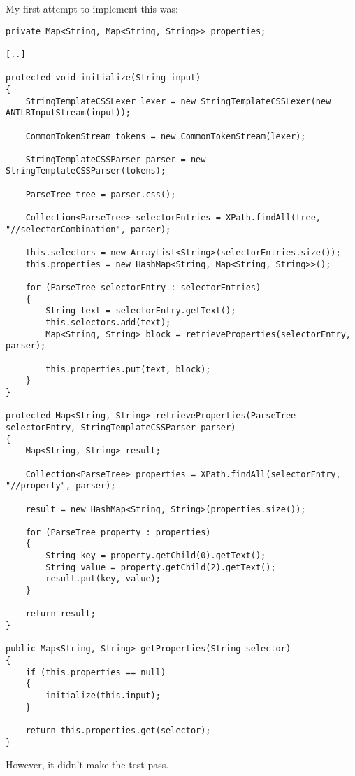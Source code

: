 \documentclass[11pt]{article}
\begin{document}
My first attempt to implement this was:

\begin{verbatim}
private Map<String, Map<String, String>> properties;

[..]

protected void initialize(String input)
{
    StringTemplateCSSLexer lexer = new StringTemplateCSSLexer(new ANTLRInputStream(input));

    CommonTokenStream tokens = new CommonTokenStream(lexer);

    StringTemplateCSSParser parser = new StringTemplateCSSParser(tokens);

    ParseTree tree = parser.css();

    Collection<ParseTree> selectorEntries = XPath.findAll(tree, "//selectorCombination", parser);

    this.selectors = new ArrayList<String>(selectorEntries.size());
    this.properties = new HashMap<String, Map<String, String>>();

    for (ParseTree selectorEntry : selectorEntries)
    {
        String text = selectorEntry.getText();
        this.selectors.add(text);
        Map<String, String> block = retrieveProperties(selectorEntry, parser);

        this.properties.put(text, block);
    }
}

protected Map<String, String> retrieveProperties(ParseTree selectorEntry, StringTemplateCSSParser parser)
{
    Map<String, String> result;

    Collection<ParseTree> properties = XPath.findAll(selectorEntry, "//property", parser);

    result = new HashMap<String, String>(properties.size());

    for (ParseTree property : properties)
    {
        String key = property.getChild(0).getText();
        String value = property.getChild(2).getText();
        result.put(key, value);
    }

    return result;
}

public Map<String, String> getProperties(String selector)
{
    if (this.properties == null)
    {
        initialize(this.input);
    }

    return this.properties.get(selector);
}
\end{verbatim}

However, it didn't make the test pass.
\end{document}
